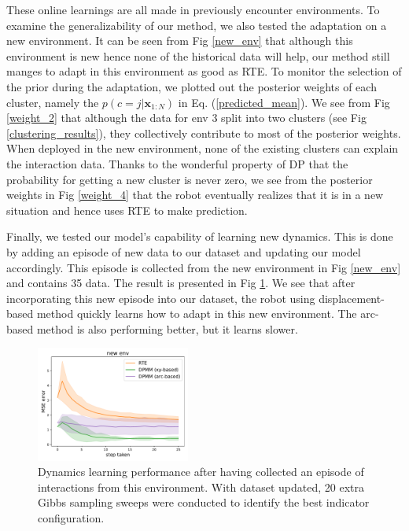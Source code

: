 \documentclass[journal]{IEEEtran}
\begin{document}
These online learnings are all made in previously encounter environments.
To examine the generalizability of our method, we also tested the adaptation on a new environment.
It can be seen from Fig \ref{new_env} that although this environment is new hence none of the historical data will help, our method still manges to adapt in this environment as good as RTE.
To monitor the selection of the prior during the adaptation, we plotted out the posterior weights of each cluster, namely the $p(c=j| \bm{x}_{1:N})$ in Eq. (\ref{predicted_mean}).
We see from Fig \ref{weight_2} that although the data for env 3 split into two clusters (see Fig \ref{clustering_results}), they collectively contribute to most of the posterior weights.
When deployed in the new environment, none of the existing clusters can explain the interaction data.
Thanks to the wonderful property of DP that the probability for getting a new cluster is never zero, we see from the posterior weights in Fig \ref{weight_4} that the robot eventually realizes that it is in a new situation and hence uses RTE to make prediction.


Finally, we tested our model's capability of learning new dynamics.
This is done by adding an episode of new data to our dataset and updating our model accordingly.
This episode is collected from the new environment in Fig \ref{new_env} and contains 35 data.
The result is presented in Fig \ref{new_adapt}.
We see that after incorporating this new episode into our dataset, the robot using displacement-based method quickly learns how to adapt in this new environment.
The arc-based method is also performing better, but it learns slower.

\begin{figure}[h]
\centering
\includegraphics[width=0.45\textwidth]{new_case4.pdf}
\caption{Dynamics learning performance after having collected an episode of interactions from this environment.
With dataset updated, 20 extra Gibbs sampling sweeps were conducted to identify the best indicator configuration.}
\label{new_adapt}
\end{figure}
\end{document}
